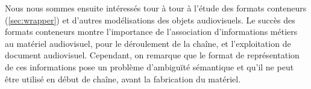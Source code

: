 Nous nous sommes ensuite intéressés tour à tour à l'étude des formats conteneurs (\ref{sec:wrapper}) et d'autres modélisations des objets audiovisuels.
Le succès des formats conteneurs montre l'importance de l'association d'informations métiers au matériel audiovisuel, pour le déroulement de la chaîne, et l'exploitation de document audiovisuel.
Cependant, on remarque que le format de représentation de ces informations pose un problème d'ambiguïté sémantique et qu'il ne peut être utilisé en début de chaîne, avant la fabrication du matériel.


